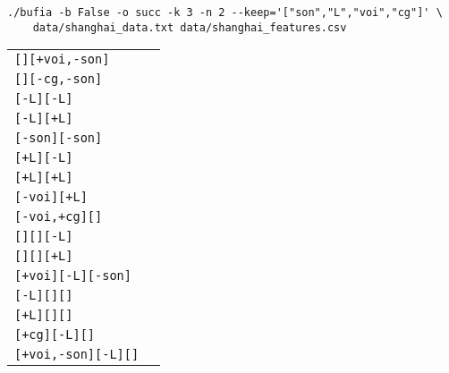 \documentclass{article}
\begin{document}
\begin{verbatim}
./bufia -b False -o succ -k 3 -n 2 --keep='["son","L","voi","cg"]' \
    data/shanghai_data.txt data/shanghai_features.csv
\end{verbatim}

\begin{tabular}{ll}
\texttt{[][+voi,-son]}     & \\
\texttt{[][-cg,-son]}      & \\
\texttt{[-L][-L]}          & \\
\texttt{[-L][+L]}          & \\
\texttt{[-son][-son]}      & \\
\texttt{[+L][-L]}          & \\
\texttt{[+L][+L]}          & \\
\texttt{[-voi][+L]}        & \\
\texttt{[-voi,+cg][]}      & \\
\texttt{[][][-L]}          & \\
\texttt{[][][+L]}          & \\
\texttt{[+voi][-L][-son]}  & \\
\texttt{[-L][][]}          & \\
\texttt{[+L][][]}          & \\
\texttt{[+cg][-L][]}       & \\
\texttt{[+voi,-son][-L][]} & \\
\end{tabular}
\end{document}
